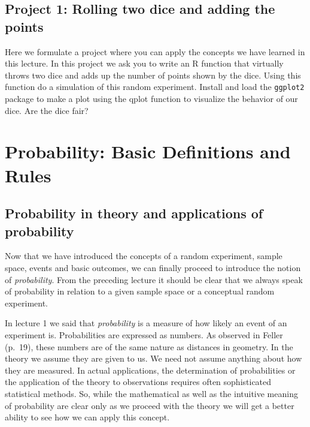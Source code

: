 \documentclass[
]{book}
\begin{document}
\hypertarget{project-1-rolling-two-dice-and-adding-the-points}{%
\section{Project 1: Rolling two dice and adding the points}\label{project-1-rolling-two-dice-and-adding-the-points}}

Here we formulate a project where you can apply the concepts we have learned in this lecture.
In this project we ask you to write an R function that virtually throws two dice and
adds up the number of points shown by the dice. Using this function do a simulation of this
random experiment. Install and load the \texttt{ggplot2} package to make a plot using the qplot function to
visualize the behavior of our dice. Are the dice fair?

\hypertarget{probability-basic-definitions-and-rules}{%
\chapter{Probability: Basic Definitions and Rules}\label{probability-basic-definitions-and-rules}}

\hypertarget{probability-in-theory-and-applications-of-probability}{%
\section{Probability in theory and applications of probability}\label{probability-in-theory-and-applications-of-probability}}

Now that we have introduced the concepts of a random experiment, sample space,
events and basic outcomes, we
can finally proceed to introduce the notion of \emph{probability}. From the preceding
lecture it should be
clear that we always speak of probability in relation to a given sample space or
a conceptual random
experiment.

In lecture 1 we said that \emph{probability} is a measure of how likely an event of an experiment is.
Probabilities are expressed as numbers. As observed in Feller (p.~19), these numbers are of the same
nature as distances in geometry. In the theory we assume they are given to us. We need not assume
anything about how they are measured. In actual applications, the determination of probabilities
or the application of the theory to observations requires often sophisticated statistical methods.
So, while the mathematical as well as the intuitive meaning of probability are clear only
as we proceed with the theory we will get a better ability to see how we can apply this concept.
\end{document}

